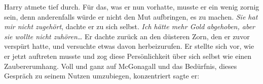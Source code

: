 Harry atmete tief durch. Für das, was er nun vorhatte, musste er ein wenig zornig sein, denn anderenfalls würde er nicht den Mut aufbringen, es zu machen. \emph{Sie hat mir nicht zugehört}, dachte er zu sich selbst. \emph{Ich hätte mehr Gold abgehoben, aber sie wollte nicht zuhören…} Er dachte zurück an den düsteren Zorn, den er zuvor verspürt hatte, und versuchte etwas davon herbeizurufen. Er stellte sich vor, wie er jetzt auftreten musste und zog diese Persönlichkeit über sich selbst wie einen Zaubererumhang. Voll und ganz auf McGonagall und das Bedürfnis, dieses Gespräch zu seinem Nutzen umzubiegen, konzentriert sagte er:


